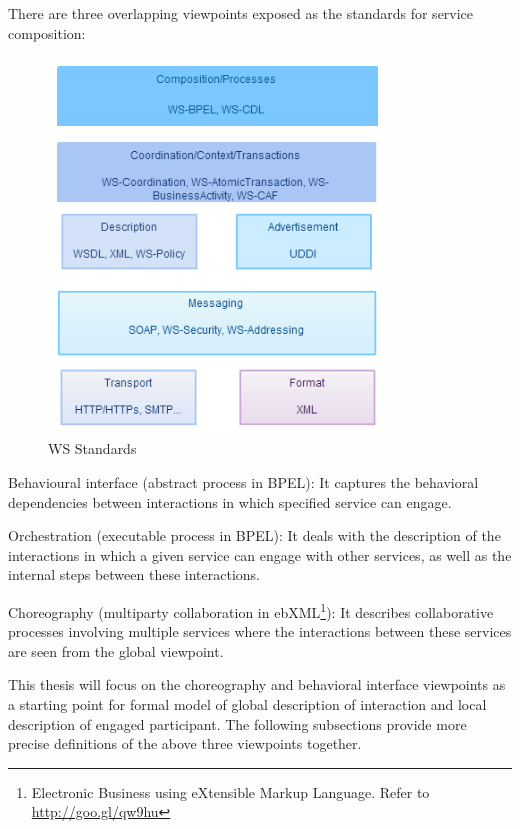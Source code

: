 There are three overlapping viewpoints exposed as the standards for service composition:

\begin{figure}
    \centering
    \includegraphics[width=0.8\textwidth]{resources/WS_stack.png}
    \caption{WS Standards}
    \label{fig:wsstd}
\end{figure}

Behavioural interface (abstract process in BPEL): It captures the behavioral dependencies between interactions in which specified service can engage.

Orchestration (executable process in BPEL): It deals with the description of the interactions in which a given service can engage with other services, as well as the internal steps between these interactions.

Choreography (multiparty collaboration in ebXML\footnote{Electronic Business using eXtensible Markup Language. Refer to \url{http://goo.gl/qw9hu}}): It describes collaborative processes involving multiple services where the interactions between these services are seen from the global viewpoint.

This thesis will focus on the choreography and behavioral interface viewpoints as a starting point for formal model of global description of interaction and local description of engaged participant. The following subsections provide more precise definitions of the above three viewpoints together.

